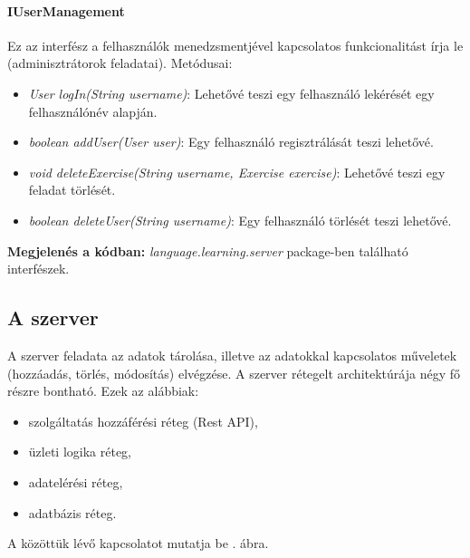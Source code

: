 \documentclass[11pt, a4paper]{article}
\begin{document}
    \paragraph{IUserManagement} Ez az interfész a felhasználók menedzsmentjével kapcsolatos funkcionalitást írja le (adminisztrátorok feladatai). Metódusai:
    \begin{itemize}
   	\item \textsl{User logIn(String username)}: Lehetővé teszi egy felhasználó lekérését egy felhasználónév alapján.
   	
   	\item \textsl{boolean addUser(User user)}: Egy felhasználó regisztrálását teszi lehetővé.
   	
   	\item \textsl{void deleteExercise(String username, Exercise exercise)}: Lehetővé teszi egy feladat törlését.
   	
   	\item \textsl{boolean deleteUser(String username)}: Egy felhasználó törlését teszi lehetővé.
   \end{itemize} 
   
    \textbf{Megjelenés a kódban:} \textit{language.learning.server} package-ben található interfészek.
    
    \subsection{A szerver}
    A szerver feladata az adatok tárolása, illetve az adatokkal kapcsolatos műveletek (hozzáadás, törlés, módosítás) elvégzése. A szerver rétegelt architektúrája négy fő részre bontható. Ezek az alábbiak:
    \begin{itemize}
    	\item szolgáltatás hozzáférési réteg (Rest API),
    	\item üzleti logika réteg,
    	\item adatelérési réteg,
    	\item adatbázis réteg.
    \end{itemize}
    A közöttük lévő kapcsolatot mutatja be . ábra.
    
\end{document}
